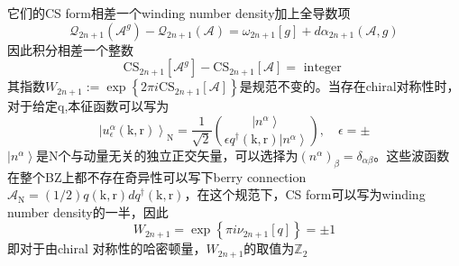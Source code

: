 \documentclass[10pt,openany]{book}
\theoremstyle{thmstyle} %
\theoremstyle{defstyle} %
\theoremstyle{prostyle} %
\begin{document}
它们的CS form相差一个winding number density加上全导数项
\begin{equation}
  \mathcal{Q}_{2 n+1}\left(\mathcal{A}^g\right)-\mathcal{Q}_{2 n+1}(\mathcal{A})=\omega_{2 n+1}[g]+d \alpha_{2 n+1}(\mathcal{A}, g)
\end{equation}
因此积分相差一个整数
\begin{equation}
  \mathrm{CS}_{2 n+1}\left[\mathcal{A}^g\right]-\mathrm{CS}_{2 n+1}[\mathcal{A}]=\text { integer }
\end{equation}
其指数$ W_{2 n+1}:=\exp \left\{2 \pi i \mathrm{CS}_{2 n+1}[\mathcal{A}]\right\} $是规范不变的。当存在chiral对称性时，对于给定q,本征函数可以写为
\begin{equation}
  \left|u_\epsilon^\alpha(\mathrm{k}, \mathrm{r})\right\rangle_{\mathrm{N}}=\frac{1}{\sqrt{2}}\binom{\left|n^\alpha\right\rangle}{\epsilon q^{\dagger}(\mathrm{k}, \mathrm{r})\left|n^\alpha\right\rangle}, \quad \epsilon= \pm
\end{equation} 
$ \left|n^\alpha\right\rangle $是N个与动量无关的独立正交矢量，可以选择为$ \left(n^\alpha\right)_\beta=\delta_{\alpha \beta} $。这些波函数在整个BZ上都不存在奇异性可以写下berry connection$ \mathcal{A}_{\mathrm{N}}=(1 / 2) q(\mathrm{k}, \mathrm{r}) d q^{\dagger}(\mathrm{k}, \mathrm{r}) $，在这个规范下，CS form可以写为winding number density的一半，因此 
\begin{equation}
  W_{2 n+1}=\exp \left\{\pi i \nu_{2 n+1}[q]\right\}= \pm 1
\end{equation}  
即对于由chiral 对称性的哈密顿量，$ W_{2 n+1} $的取值为$ \mathbb{Z}_2 $  
   
\end{document}
